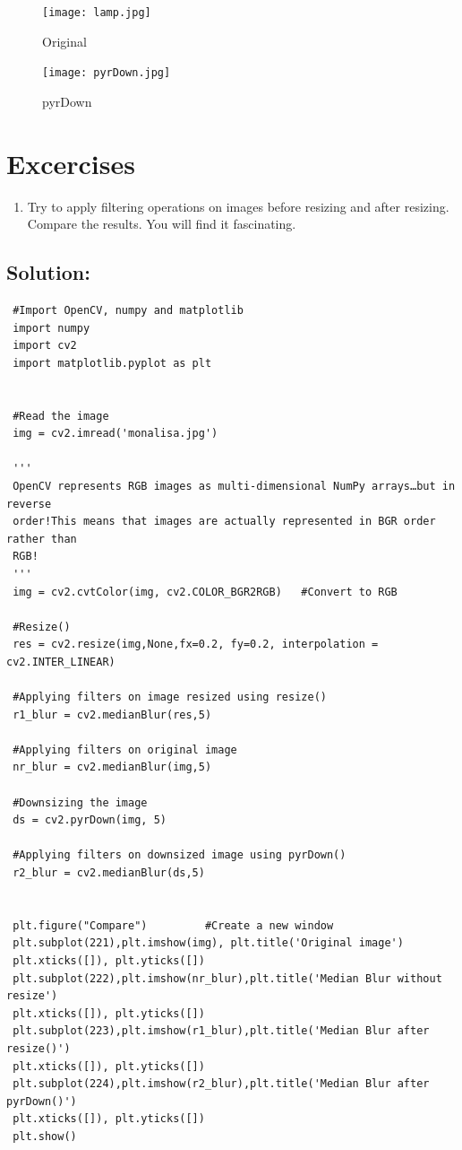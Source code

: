 \documentclass[]{article}
\providecommand{\tightlist}{%
  \setlength{\itemsep}{0pt}\setlength{\parskip}{0pt}}
\begin{document}
\newpage
\begin{figure}
	\centering
	\texttt{[image: lamp.jpg]} 
	\caption{Original} 
	\texttt{[image: pyrDown.jpg]}
	\caption{pyrDown}
\end{figure}
\section{Excercises}\label{excercises}

\begin{enumerate}
\def\labelenumi{\arabic{enumi}.}
\tightlist
\item
  Try to apply filtering operations on images before resizing and after
  resizing. Compare the results. You will find it fascinating.
\end{enumerate}

\subsection{Solution:}\label{solution}

\begin{verbatim}
 #Import OpenCV, numpy and matplotlib
 import numpy
 import cv2
 import matplotlib.pyplot as plt


 #Read the image
 img = cv2.imread('monalisa.jpg')

 '''
 OpenCV represents RGB images as multi-dimensional NumPy arrays…but in reverse
 order!This means that images are actually represented in BGR order rather than
 RGB!
 '''
 img = cv2.cvtColor(img, cv2.COLOR_BGR2RGB)   #Convert to RGB

 #Resize()
 res = cv2.resize(img,None,fx=0.2, fy=0.2, interpolation = cv2.INTER_LINEAR)
 
 #Applying filters on image resized using resize()
 r1_blur = cv2.medianBlur(res,5)

 #Applying filters on original image
 nr_blur = cv2.medianBlur(img,5)

 #Downsizing the image
 ds = cv2.pyrDown(img, 5)

 #Applying filters on downsized image using pyrDown()
 r2_blur = cv2.medianBlur(ds,5)


 plt.figure("Compare")         #Create a new window
 plt.subplot(221),plt.imshow(img), plt.title('Original image')
 plt.xticks([]), plt.yticks([])
 plt.subplot(222),plt.imshow(nr_blur),plt.title('Median Blur without resize')
 plt.xticks([]), plt.yticks([])
 plt.subplot(223),plt.imshow(r1_blur),plt.title('Median Blur after resize()')
 plt.xticks([]), plt.yticks([])
 plt.subplot(224),plt.imshow(r2_blur),plt.title('Median Blur after pyrDown()')
 plt.xticks([]), plt.yticks([])
 plt.show()
\end{verbatim}
\end{document}
